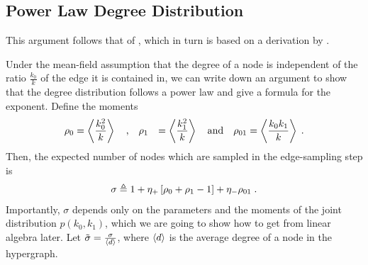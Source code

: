 \documentclass[aps,pre,reprint,superscriptaddress,nofootinbib]{revtex4-2}
\begin{document}
\subsection{Power Law Degree Distribution}




This argument follows that of \cite{heEdgeCorrelationsLink2025}, which in turn is based on a derivation by \cite{mitzenmacherBriefHistoryGenerative2004}. 

Under the mean-field assumption that the degree of a node is independent of the ratio $\frac{k_0}{k}$ of the edge it is contained in, we can write down an argument to show that the degree distribution follows a power law and give a formula for the exponent. 
Define the moments 
\begin{align}
    \rho_{0} &= \left\langle \frac{k_0^2}{k} \right\rangle \quad \text{,} \quad \rho_{1} &= \left\langle \frac{k_1^2}{k} \right\rangle \quad \text{and} \quad \rho_{01} = \left\langle \frac{k_0 k_1}{k} \right\rangle \;.
\end{align}
Then, the expected number of nodes which are sampled in the edge-sampling step is 
\begin{align}
    \sigma \triangleq 1 + \eta_+ \left[ \rho_0 + \rho_1 - 1 \right] + \eta_- \rho_{01}\;.
\end{align}
Importantly, $\sigma$ depends only on the parameters and the moments of the joint distribution $p(k_0, k_1)$, which we are going to show how to get from linear algebra later.
Let $\tilde{\sigma} = \frac{\sigma}{\left\langle d \right\rangle}$, where $\left\langle d \right\rangle$ is the average degree of a node in the hypergraph.
\end{document}
